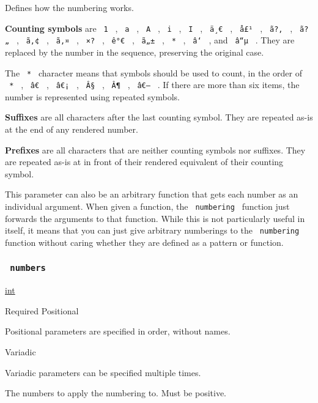 Defines how the numbering works.

\textbf{Counting symbols} are \texttt{\ 1\ } , \texttt{\ a\ } ,
\texttt{\ A\ } , \texttt{\ i\ } , \texttt{\ I\ } , \texttt{\ ä¸€\ } ,
\texttt{\ å£¹\ } , \texttt{\ ã?‚\ } , \texttt{\ ã?„\ } ,
\texttt{\ ã‚¢\ } , \texttt{\ ã‚¤\ } , \texttt{\ ×?\ } , \texttt{\ ê°€\ }
, \texttt{\ ã„±\ } , \texttt{\ *\ } , \texttt{\ â‘\ } , and
\texttt{\ â“µ\ } . They are replaced by the number in the sequence,
preserving the original case.

The \texttt{\ *\ } character means that symbols should be used to count,
in the order of \texttt{\ *\ } , \texttt{\ â€\ } , \texttt{\ â€¡\ } ,
\texttt{\ Â§\ } , \texttt{\ Â¶\ } , \texttt{\ â€–\ } . If there are more
than six items, the number is represented using repeated symbols.

\textbf{Suffixes} are all characters after the last counting symbol.
They are repeated as-is at the end of any rendered number.

\textbf{Prefixes} are all characters that are neither counting symbols
nor suffixes. They are repeated as-is at in front of their rendered
equivalent of their counting symbol.

This parameter can also be an arbitrary function that gets each number
as an individual argument. When given a function, the
\texttt{\ numbering\ } function just forwards the arguments to that
function. While this is not particularly useful in itself, it means that
you can just give arbitrary numberings to the \texttt{\ numbering\ }
function without caring whether they are defined as a pattern or
function.

\subsubsection{\texorpdfstring{\texttt{\ numbers\ }}{ numbers }}\label{parameters-numbers}

\href{/docs/reference/foundations/int/}{int}

{Required} {{ Positional }}

\label{parameters-numbers-positional-tooltip}
Positional parameters are specified in order, without names.

{{ Variadic }}

\label{parameters-numbers-variadic-tooltip}
Variadic parameters can be specified multiple times.

The numbers to apply the numbering to. Must be positive.

